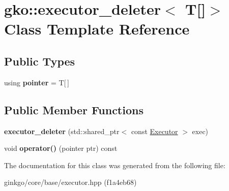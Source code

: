 \hypertarget{classgko_1_1executor__deleter_3_01T[]_4}{}\section{gko\+:\+:executor\+\_\+deleter$<$ T\mbox{[}\mbox{]}$>$ Class Template Reference}
\label{classgko_1_1executor__deleter_3_01T[]_4}
\subsection*{Public Types}
\begin{DoxyCompactItemize}
\item 
\mbox{\label{classgko_1_1executor__deleter_3_01T[]_4_ad28bfaa2f1d909bc11117a4889581a02}} 
using {\bfseries pointer} = T\mbox{[}$\,$\mbox{]}
\end{DoxyCompactItemize}
\subsection*{Public Member Functions}
\begin{DoxyCompactItemize}
\item 
\mbox{\label{classgko_1_1executor__deleter_3_01T[]_4_ab60279758e90bdcd14b076c55813d5be}} 
{\bfseries executor\+\_\+deleter} (std\+::shared\+\_\+ptr$<$ const \hyperlink{classgko_1_1Executor}{Executor} $>$ exec)
\item 
\mbox{\label{classgko_1_1executor__deleter_3_01T[]_4_a83f935eea2ed81964c8a018964c96934}} 
void {\bfseries operator()} (pointer ptr) const
\end{DoxyCompactItemize}


The documentation for this class was generated from the following file\+:\begin{DoxyCompactItemize}
\item 
ginkgo/core/base/executor.\+hpp (f1a4eb68)\end{DoxyCompactItemize}
